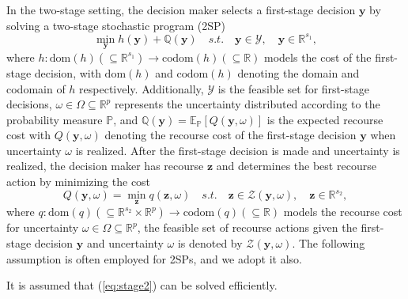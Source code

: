 In the two-stage setting, the decision maker selects a first-stage decision $\boldsymbol{y}$ by solving a two-stage stochastic program (2SP)
\begin{equation}
    \min_{\boldsymbol{y}} h(\boldsymbol{y}) + \mathbb{Q}(\boldsymbol{y}) \quad \textit{s.t.} \quad \boldsymbol{y} \in \mathcal{Y}, \quad \boldsymbol{y} \in \mathbb{R}^{s_1},  \label{eq:Stage I} \tag{2SP}
\end{equation}
where $h:  \text{dom}(h) (\subseteq \mathbb{R}^{s_1}) \rightarrow \text{codom}(h) (\subseteq \mathbb{R})$ models the cost of the first-stage decision, with $\text{dom}(h)$ and $\text{codom}(h)$ denoting the domain and codomain of $h$ respectively. Additionally, $\mathcal{Y}$ is the feasible set for first-stage decisions, $\omega \in \Omega \subseteq \mathbb{R}^p$ represents the uncertainty distributed according to the probability measure $\mathbb{P}$, and $\mathbb{Q}(\boldsymbol{y}) = \mathbb{E}_{\mathbb{P}}[Q(\boldsymbol{y}, \omega)]$ is the expected recourse cost with $Q(\boldsymbol{y}, \omega)$ denoting the recourse cost of the first-stage decision $\boldsymbol{y}$ when uncertainty $\omega$ is realized. After the first-stage decision is made and uncertainty is realized, the decision maker has recourse $\boldsymbol{z}$ and determines the best recourse action by minimizing the cost
\begin{equation}
Q(\boldsymbol{y}, \omega) = \min_{\boldsymbol{z}} q(\boldsymbol{z}, \omega) \quad  \textit{s.t.} \quad \boldsymbol{z} \in \mathcal{Z}(\boldsymbol{y}, \omega), \quad \boldsymbol{z} \in \mathbb{R}^{s_2}, \label{eq:stage2} \tag{Stage II}
\end{equation} 
where $q: \text{dom}(q) (\subseteq \mathbb{R}^{s_2} \times \mathbb{R}^{p}) \rightarrow \text{codom}(q) (\subseteq \mathbb{R})$ models the recourse cost for uncertainty $\omega \in \Omega \subseteq \mathbb{R}^p$, the feasible set of recourse actions given the first-stage decision $\boldsymbol{y}$ and uncertainty $\omega$ is denoted by $\mathcal{Z}(\boldsymbol{y}, \omega)$. The following assumption is often employed for 2SPs, and we adopt it also.
\begin{assumption}\label{a1}
    It is assumed that (\ref{eq:stage2}) can be solved efficiently.
\end{assumption}


